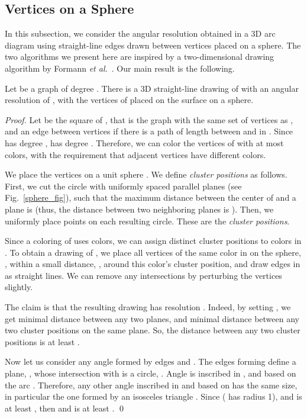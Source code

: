 \subsection{Vertices on a Sphere}

In this subsection,
we consider the angular resolution obtained in a 3D arc diagram
using straight-line edges
drawn between vertices placed on a sphere. 
The two algorithms we present here are inspired
by a two-dimensional 
drawing algorithm 
by Formann {\it et al.}~\cite{DBLP:conf/focs/FormannHHKLSWW90}.
Our main result is the following.

\begin{theorem}
\label{sphere_thm_1}
Let  be a graph of degree . There is a 3D straight-line drawing
of  with an angular resolution of , with the vertices
of  placed on the surface on a sphere.
\end{theorem}
\begin{proof}
Let  be the square of ,
that is the graph with the same set of vertices as ,
and an edge between vertices  if there is a path of length 
between  and  in . Since  has degree ,  has degree
. Therefore, we can color the vertices of  with
at most  colors, with the requirement that adjacent vertices have
different colors.

We place the vertices on a unit sphere . We define 
\emph{cluster positions} as follows. First, we cut
the circle with  uniformly spaced parallel planes
(see Fig.~\ref{sphere_fig}), such that
the maximum distance between the center of  and a plane
is  (thus, the distance between two neighboring planes is ).
Then, we uniformly place  points on each resulting circle.
These are the \emph{cluster positions}.

Since a coloring  of  uses  colors,
we can assign distinct cluster positions to colors in .
To obtain a drawing of , we place all vertices of the same color
in  on the sphere, , within
a small distance, , around this color's cluster position,
and draw edges in  as straight lines. We can remove any intersections
by perturbing the vertices slightly.

The claim is that the resulting drawing has resolution .
Indeed, by setting , we get 
minimal distance between any two planes, and  minimal
distance between any two cluster positions on the same plane.
So, the distance between any two cluster positions is at least
.

Now let us consider any angle 
formed by edges  and .
The edges forming  define a plane, ,
whose intersection with  is a circle, .
Angle  is inscribed in , and based on the arc
. Therefore, any other angle inscribed in 
and based on  has the same size, in particular
the one formed by an isosceles triangle .
Since  (
has radius 1), and  is at least , then
 and is at least
.
\qed
\end{proof}

